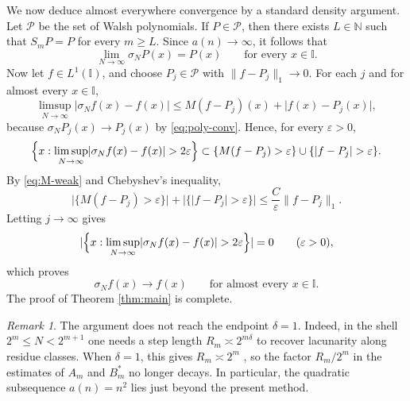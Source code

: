 \documentclass[11pt]{amsart}
\numberwithin{equation}{section}
\theoremstyle{remark}
\newtheorem{remark}[theorem]{Remark}
\begin{document}
We now deduce almost everywhere convergence by a standard density argument.
Let $\mathcal{P}$ be the set of Walsh polynomials. If $P\in\mathcal{P}$,
then there exists $L\in\mathbb{N}$ such that $S_mP=P$ for every $m\ge L$.
Since $a(n)\to\infty$, it follows that 
\begin{equation}
\lim_{N\to\infty}\sigma_NP(x)=P(x) \qquad\text{for every }x\in\mathbb{I}.
\label{eq:poly-conv}
\end{equation}
Now let $f\in L^1(\mathbb{I})$, and choose $P_j\in\mathcal{P}$ with $\lVert
f-P_j\rVert_1\to0$. For each $j$ and for almost every $x\in\mathbb{I}$, 
\begin{equation*}
\limsup_{N\to\infty}\lvert \sigma_Nf(x)-f(x)\rvert \le M(f-P_j)(x)+\lvert
f(x)-P_j(x)\rvert, 
\end{equation*}
because $\sigma_NP_j(x)\to P_j(x)$ by \eqref{eq:poly-conv}. Hence, for every 
$\varepsilon>0$, 
\begin{equation*}
\Bigl\{x:\limsup_{N\to\infty}\lvert \sigma_Nf(x)-f(x)\rvert>2\varepsilon%
\Bigr\}
\subset \{M(f-P_j)>\varepsilon\}\cup\{\lvert f-P_j\rvert>\varepsilon\}. 
\end{equation*}
By \eqref{eq:M-weak} and Chebyshev's inequality, 
\begin{equation*}
\lvert \{M(f-P_j)>\varepsilon\}\rvert+\lvert \{\lvert
f-P_j\rvert>\varepsilon\}\rvert \le \frac{C}{\varepsilon}\lVert
f-P_j\rVert_1. 
\end{equation*}
Letting $j\to\infty$ gives 
\begin{equation*}
\lvert \Bigl\{x:\limsup_{N\to\infty}\lvert
\sigma_Nf(x)-f(x)\rvert>2\varepsilon\Bigr\}\rvert=0 \qquad (\varepsilon>0), 
\end{equation*}
which proves 
\begin{equation*}
\sigma_Nf(x)\to f(x) \qquad\text{for almost every }x\in\mathbb{I}. 
\end{equation*}
The proof of Theorem \ref{thm:main} is complete.

\begin{remark}
The argument does not reach the endpoint $\delta=1$. Indeed, in the shell $%
2^m\le N<2^{m+1}$ one needs a step length $R_m\asymp 2^{m\delta}$ to recover
lacunarity along residue classes. When $\delta=1$, this gives $R_m\asymp 2^m$%
, so the factor $R_m/2^m$ in the estimates of $A_m$ and $B_m^*$ no longer
decays. In particular, the quadratic subsequence $a(n)=n^2$ lies just beyond
the present method.
\end{remark}
\end{document}
